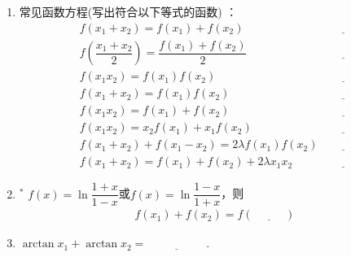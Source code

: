 \documentclass{article}
\newif\ifte
\begin{document}
\begin{multicols}{2}
\begin{enumerate}[leftmargin=20pt]
\item 常见函数方程\ifte \else (写出符合以下等式的函数) \fi：
\begin{align*}
&f(x_1+x_2)=f(x_1)+f(x_2)   	
    &\underline{\ \ifte kx\else \hspace{1cm} \fi\ } \\
&f\left(\dfrac{x_1+x_2}{2}\right) =\dfrac{f(x_1)+f(x_2)}{2}  
    &\underline{\ \ifte kx+b\else \hspace{1cm} \fi\ }\\
&f(x_1x_2)=f(x_1)f(x_2)   	
    & \underline{\ \ifte x^{\alpha}\else \hspace{1cm} \fi\ }\\
&f(x_1+x_2)=f(x_1)f(x_2)   	
    &\underline{\ \ifte a^x\else \hspace{1cm} \fi\ }\\
&f(x_1x_2)=f(x_1)+f(x_2)   	
    &\underline{\ \ifte \log_{a}x\else \hspace{1cm} \fi\ } \\
&f(x_1x_2)=x_2f(x_1)+x_1f(x_2)   	
    &\underline{\ \ifte x\log_{a}x\else \hspace{1cm} \fi\ } \\
& f(x_1+x_2)+f(x_1-x_2)=2\lambda f(x_1)f(x_2)
    &\underline{\ \ifte \dfrac{1}{\lambda}\cos x \else \hspace{1cm} \fi\ } \\
& f(x_1+x_2)= f(x_1)+f(x_2)+2\lambda x_1x_2
    &\underline{\ \ifte \lambda x^2+\mu x \else \hspace{1cm} \fi\ } 
\end{align*}

\item $^*$ $ f(x)=\ln \dfrac{1+x}{1-x} $或$ f(x)=\ln \dfrac{1-x}{1+x} $，则
\begin{gather*}
    f(x_1)+f(x_2)=f\left(\underline{\ \ifte \dfrac{x_1+x_2}{1+x_1x_2}
        \else \hspace{1cm} \fi\ } \right)
\end{gather*}

\item $ \arctan x_1+\arctan x_2=\underline{\ \ifte 
  \arctan\dfrac{x_1+x_2}{1-x_1x_2} \else \hspace{2cm} \fi\ } $.


\end{enumerate}
\end{multicols}
\end{document}
